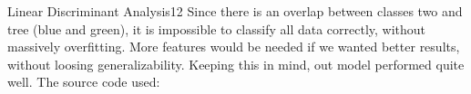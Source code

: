 \begin{questions}
\begin{question}{Linear Discriminant Analysis}{12}
Since there is an overlap between classes two and tree (blue and green), it is impossible to classify all data correctly, without massively overfitting. More features would be needed if we wanted better results, without loosing generalizability. Keeping this in mind, out model performed quite well.
The source code used:

 
\end{question}


\end{questions}
